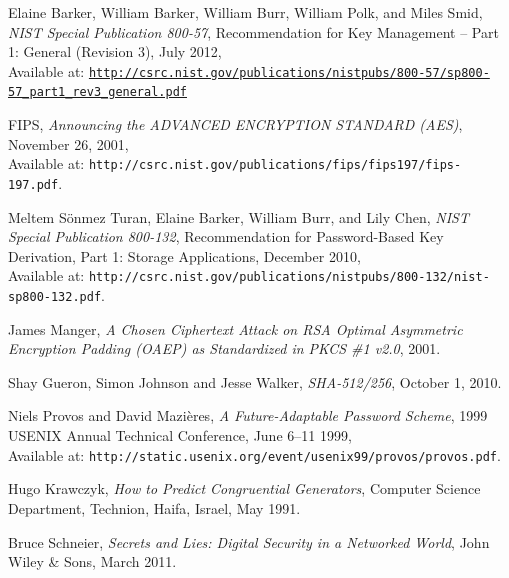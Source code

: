 \documentclass[12pt, titlepage]{article}
\begin{document}
\begin{thebibliography}{10}
Elaine Barker, William Barker, William Burr, William Polk, and Miles Smid, \emph{NIST Special Publication 800-57}, Recommendation for Key Management – Part 1: General (Revision 3), July
2012,
\\ Available at: \texttt{\url{http://csrc.nist.gov/publications/nistpubs/800-57/sp800-57_part1_rev3_general.pdf}}

FIPS, \emph{Announcing the ADVANCED ENCRYPTION STANDARD (AES)}, November 26, 2001,
\\ Available at:
\texttt{http://csrc.nist.gov/publications/fips/fips197/fips-197.pdf}.

Meltem Sönmez Turan, Elaine Barker, William Burr, and Lily Chen, \emph{NIST Special Publication 800-132}, Recommendation for Password-Based Key Derivation, Part 1: Storage Applications, December 2010,
\\ Available at: \texttt{http://csrc.nist.gov/publications/nistpubs/800-132/nist-sp800-132.pdf}.

James Manger, \emph{A Chosen Ciphertext Attack on RSA Optimal Asymmetric Encryption Padding (OAEP) as Standardized in PKCS \#1 v2.0}, 2001.

Shay Gueron, Simon Johnson and Jesse Walker, \emph{SHA-512/256}, October 1, 2010.

Niels Provos and David Mazières, \emph{A Future-Adaptable Password Scheme}, 1999 USENIX Annual Technical Conference, June 6–11 1999,
\\ Available at: \texttt{http://static.usenix.org/event/usenix99/provos/provos.pdf}. 

Hugo Krawczyk, \emph{How to Predict Congruential Generators}, Computer Science Department, Technion, Haifa, Israel, May 1991. 

Bruce Schneier, \emph{Secrets and Lies: Digital Security in a Networked World},  John Wiley \& Sons, March 2011.

\end{thebibliography}
\end{document}
